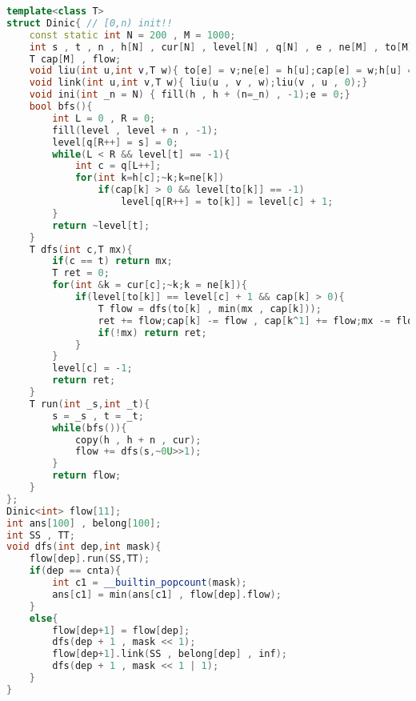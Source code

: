\begin{lstlisting}[language=C++]
template<class T>
struct Dinic{ // [0,n) init!!
    const static int N = 200 , M = 1000;
    int s , t , n , h[N] , cur[N] , level[N] , q[N] , e , ne[M] , to[M];
    T cap[M] , flow;
    void liu(int u,int v,T w){ to[e] = v;ne[e] = h[u];cap[e] = w;h[u] = e++;};
    void link(int u,int v,T w){ liu(u , v , w);liu(v , u , 0);}
    void ini(int _n = N) { fill(h , h + (n=_n) , -1);e = 0;}
    bool bfs(){
        int L = 0 , R = 0;
        fill(level , level + n , -1);
        level[q[R++] = s] = 0;
        while(L < R && level[t] == -1){
            int c = q[L++];
            for(int k=h[c];~k;k=ne[k])
                if(cap[k] > 0 && level[to[k]] == -1)
                    level[q[R++] = to[k]] = level[c] + 1;
        }
        return ~level[t];
    }
    T dfs(int c,T mx){
        if(c == t) return mx;
        T ret = 0;
        for(int &k = cur[c];~k;k = ne[k]){
            if(level[to[k]] == level[c] + 1 && cap[k] > 0){
                T flow = dfs(to[k] , min(mx , cap[k]));
                ret += flow;cap[k] -= flow , cap[k^1] += flow;mx -= flow;
                if(!mx) return ret;
            }
        }
        level[c] = -1;
        return ret;
    }
    T run(int _s,int _t){
        s = _s , t = _t;
        while(bfs()){
            copy(h , h + n , cur);
            flow += dfs(s,~0U>>1);
        }
        return flow;
    }
};
Dinic<int> flow[11];
int ans[100] , belong[100];
int SS , TT;
void dfs(int dep,int mask){
    flow[dep].run(SS,TT);
    if(dep == cnta){
        int c1 = __builtin_popcount(mask);
        ans[c1] = min(ans[c1] , flow[dep].flow);
    }
    else{
        flow[dep+1] = flow[dep];
        dfs(dep + 1 , mask << 1);
        flow[dep+1].link(SS , belong[dep] , inf);
        dfs(dep + 1 , mask << 1 | 1);
    }
}


\end{lstlisting}
